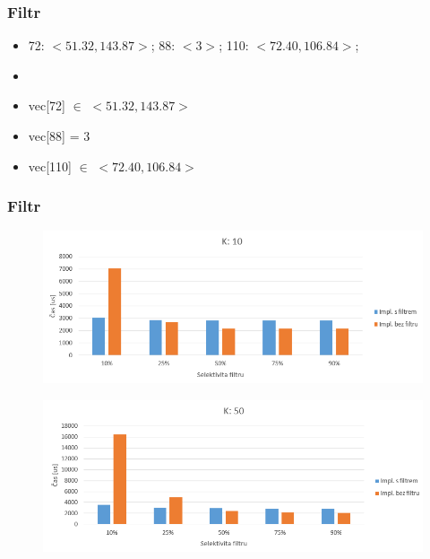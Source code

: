 \documentclass{beamer}
\begin{document}
	\begin{frame}
		\frametitle{Filtr}
		
		\begin{itemize}
			\item 72: $<51.32,143.87>$; 88: $<3>$; 110: $<72.40,106.84>$;
			\item[]
			\item vec[72] $\in$ $<51.32,143.87>$
			\item vec[88] = 3
			\item vec[110]  $\in$ $<72.40,106.84>$
		\end{itemize}
		
	\end{frame}

	\begin{frame}
		\frametitle{Filtr}
		
		\begin{figure}
			\includegraphics[scale=0.4]{figures/graf_filtr_k10.png}
		\end{figure}
	
		\begin{figure}
			\includegraphics[scale=0.4]{figures/graf_filtr_k50.png}
		\end{figure}
		
	\end{frame}
\end{document}
